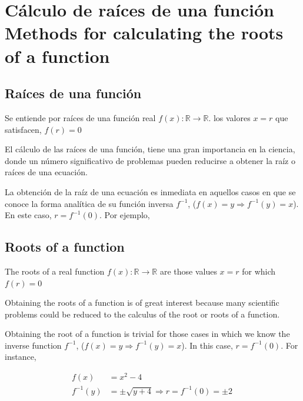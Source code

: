 \chapter{Cálculo de raíces de una función\\ Methods for calculating the roots of a function }


\begin{paracol}{2}
\section{Raíces de una función}
Se entiende por raíces de una función real $f(x):\mathbb{R} \rightarrow \mathbb{R}$. los valores $x=r$ que satisfacen, $f(r)=0$

El cálculo de las raíces de una función, tiene una gran importancia en la ciencia, donde un número significativo de problemas pueden reducirse a obtener la raíz o raíces de una ecuación.

La obtención de la raíz de una ecuación es inmediata en aquellos casos en que se conoce la forma analítica de su función inversa $f^{-1}$, ($f(x)=y\Rightarrow f^{-1}(y)=x$). En este caso, $r=f^{-1}(0)$. Por ejemplo,
\switchcolumn
\section{Roots of a function}
The roots of a real function $f(x):\mathbb{R} \rightarrow \mathbb{R}$ are those values $x = r $ for which $f(r) = 0$

Obtaining the roots of a function is of great interest because many scientific problems could be reduced to the calculus of the root or roots of a function.

Obtaining the root of a function is trivial for those cases in which we know the inverse function $f^{-1}$, ($f(x)=y\Rightarrow f^{-1}(y)=x$). In this case, $r=f^{-1}(0)$. For instance,  
\end{paracol}

\begin{align*}
f(x)&=x^2-4\\
f^{-1}(y)&=\pm\sqrt{y+4}\Rightarrow r=f^{-1}(0)=\pm 2\
\end{align*}


